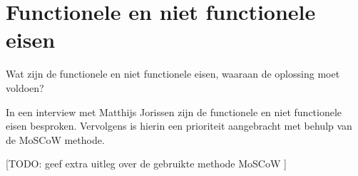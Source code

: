 \section{Functionele en niet functionele eisen}
\label{sec:deelvraag1}

Wat zijn de functionele en niet functionele eisen, waaraan de oplossing moet voldoen?

In een interview met Matthijs Jorissen zijn de functionele en niet functionele eisen besproken. Vervolgens is hierin een prioriteit aangebracht met behulp van de MoSCoW methode. 

[TODO: geef extra uitleg over de gebruikte methode MoSCoW \textcite{ma2009effectiveness}]

\begin{comment}
Een functionele eis kan gezien worden als iets dat de gebruiker nodig heeft om het doel te bereiken of een bepaalde voorwaarde waaraan de oplossing moet voldoen.

Een non functionele eis is een beperking doe wordt opgelegd op een mogelijke oplossing, met het doel om functionele eisen te behalen of het doel van het project.
\end{comment}

